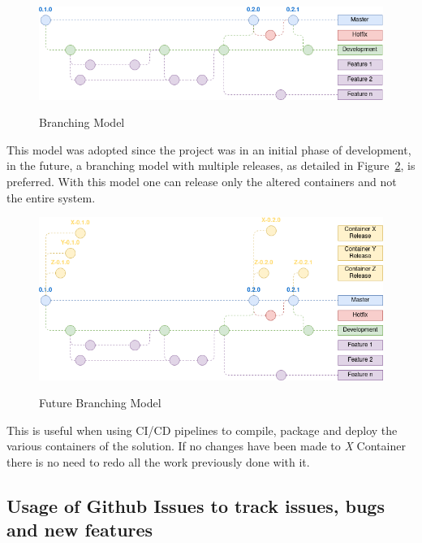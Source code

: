 \begin{figure}[H]
    \centering
    \resizebox{\columnwidth}{!}
    {
       \includegraphics{assets/figures/branching-model.png}
    }
    \caption[Branching Model]{Branching Model}
    \label{fig:implementation:decisions:git:branch}
\end{figure}

This model was adopted since the project was in an initial phase of development, in the future, a branching model with multiple releases, as detailed in Figure~\ref{fig:implementation:decisions:git:branch2}, is preferred. With this model one can release only the altered containers and not the entire system.

\begin{figure}[H]
    \centering
    \resizebox{\columnwidth}{!}
    {
       \includegraphics{assets/figures/branching-model-2.png}
    }
    \caption[Future Branching Model]{Future Branching Model}
    \label{fig:implementation:decisions:git:branch2}
\end{figure}

This is useful when using CI/CD pipelines to compile, package and deploy the various containers of the solution. If no changes have been made to \textit{X} Container there is no need to redo all the work previously done with it.

\subsection{Usage of Github Issues to track issues, bugs and new features}
\label{subsec:implementation:decisions:issues}

